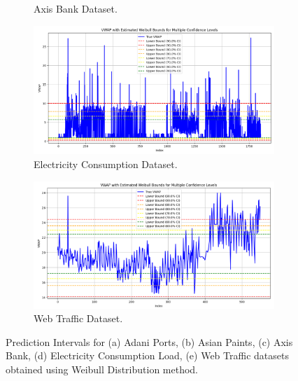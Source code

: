 \begin{figure}[H]
\begin{minipage}{0.6\textwidth}
\begin{subfigure}[b]{0.8\textwidth}
                \caption{Axis Bank Dataset.}
            \end{subfigure}
            \begin{subfigure}[b]{0.8\textwidth}
                \centering
                \includegraphics[width=\textwidth]{Chap02/figs/Weibull_Electricity_Consumption.png}
                \caption{Electricity Consumption Dataset.}
            \end{subfigure}

            \begin{subfigure}[b]{0.8\textwidth}
                \centering
                \includegraphics[width=\textwidth]{Chap02/figs/Weibull_Web_Traffic.png}
                \caption{Web Traffic Dataset.}
            \end{subfigure}
        \end{minipage}
    
    \caption{Prediction Intervals for (a) Adani Ports, (b) Asian Paints, (c) Axis Bank, (d) Electricity Consumption Load, (e) Web Traffic datasets obtained using Weibull Distribution method.}
    \label{Fi 3.7}
\end{figure}

